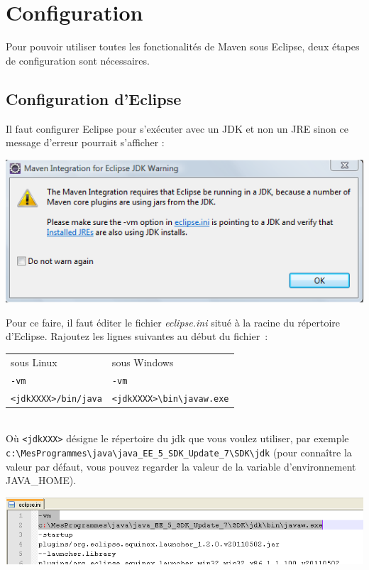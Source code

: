 % 

\section{Configuration}
Pour pouvoir utiliser toutes les fonctionalités de Maven sous Eclipse, deux étapes de configuration sont nécessaires.

\subsection{Configuration d'Eclipse}
Il faut configurer Eclipse pour s'exécuter avec un JDK et non un JRE sinon ce message d'erreur pourrait s'afficher : 

\begin{center}
\includegraphics[width=0.4\linewidth]{../../resources/images/guide_installation/warningJRE.png}
\end{center}

\noindent
Pour ce faire, il faut éditer le fichier \emph{eclipse.ini} situé à la racine du répertoire d'Eclipse. Rajoutez les lignes suivantes au début du fichier~:\\

\smallskip 

\begin{tabular}[!t]{l|l}
sous Linux&sous Windows\\
\verb|-vm|&\verb|-vm|\\
\verb|<jdkXXXX>/bin/java|&\verb|<jdkXXXX>\bin\javaw.exe|\\
\end{tabular}\\

\medskip 
\noindent
Où \verb|<jdkXXX>| désigne le répertoire du jdk que vous voulez utiliser, par exemple \\
\verb|c:\MesProgrammes\java\java_EE_5_SDK_Update_7\SDK\jdk|
(pour conna\^itre la valeur par défaut, vous pouvez regarder la valeur de la variable d'environnement JAVA\_HOME).

\medskip 
\begin{center}
\includegraphics[width=1.0\linewidth]{../../resources/images/guide_installation/eclipse_ini.png}
\end{center}

